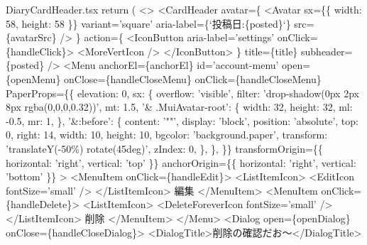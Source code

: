 \begin{starterprogram}[]{DiaryCardHeader.tsx}
{    return (
      \textless{}\textgreater{}
        \textless{}CardHeader
          avatar=\{
            \textless{}Avatar
              sx=\{\{ width: 58, height: 58 \}\}
              variant='square'
              aria{-}label=\{`投稿日:\textdollar{}\{posted\}`\}
              src=\{avatarSrc\}
            /\textgreater{}
          \}
          action=\{
            \textless{}IconButton aria{-}label='settings' onClick=\{handleClick\}\textgreater{}
              \textless{}MoreVertIcon /\textgreater{}
            \textless{}/IconButton\textgreater{}
          \}
          title=\{title\}
          subheader=\{posted\}
        /\textgreater{}
        \textless{}Menu
          anchorEl=\{anchorEl\}
          id='account{-}menu'
          open=\{openMenu\}
          onClose=\{handleCloseMenu\}
          onClick=\{handleCloseMenu\}
          PaperProps=\{\{
            elevation: 0,
            sx: \{
              overflow: 'visible',
              filter: 'drop{-}shadow(0px 2px 8px rgba(0,0,0,0.32))',
              mt: 1.5,
              '\& .MuiAvatar{-}root': \{
                width: 32,
                height: 32,
                ml: {-}0.5,
                mr: 1,
              \},
              '\&:before': \{
                content: '""',
                display: 'block',
                position: 'absolute',
                top: 0,
                right: 14,
                width: 10,
                height: 10,
                bgcolor: 'background.paper',
                transform: 'translateY({-}50\%) rotate(45deg)',
                zIndex: 0,
              \},
            \},
          \}\}
          transformOrigin=\{\{ horizontal: 'right', vertical: 'top' \}\}
          anchorOrigin=\{\{ horizontal: 'right', vertical: 'bottom' \}\}
        \textgreater{}
          \textless{}MenuItem onClick=\{handleEdit\}\textgreater{}
            \textless{}ListItemIcon\textgreater{}
              \textless{}EditIcon fontSize='small' /\textgreater{}
            \textless{}/ListItemIcon\textgreater{}
            編集
          \textless{}/MenuItem\textgreater{}
          \textless{}MenuItem onClick=\{handleDelete\}\textgreater{}
            \textless{}ListItemIcon\textgreater{}
              \textless{}DeleteForeverIcon fontSize='small' /\textgreater{}
            \textless{}/ListItemIcon\textgreater{}
            削除
          \textless{}/MenuItem\textgreater{}
        \textless{}/Menu\textgreater{}
        \textless{}Dialog open=\{openDialog\} onClose=\{handleCloseDialog\}\textgreater{}
          \textless{}DialogTitle\textgreater{}削除の確認だお〜\textless{}/DialogTitle\textgreater{}
}
\end{starterprogram}
